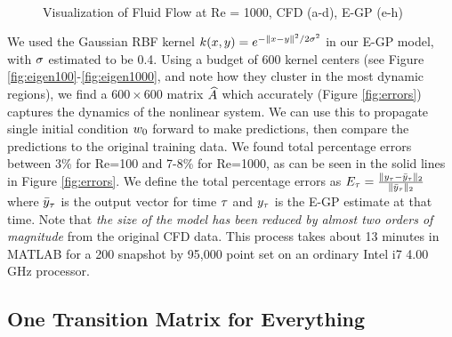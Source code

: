 \begin{figure*}[h] %
	\centering
	\\
	\caption{Visualization of Fluid Flow at Re = 1000, CFD (a-d), E-GP (e-h)}
	\label{fig:cfd_1000}
\end{figure*}

We used the Gaussian RBF kernel $k(x,y) = e^{-\|x-y\|^2/2\sigma^2}$ in our E-GP model, with $\sigma$ estimated to be 0.4. Using a budget of 600 kernel centers (see Figure \ref{fig:eigen100}-\ref{fig:eigen1000}, and note how they cluster in the most dynamic regions), we find a $600\times600$ matrix $\widehat{A}$ which accurately (Figure \ref{fig:errors}) captures the dynamics of the nonlinear system. We can use this to propagate single initial condition $w_{0}$ forward to make predictions, then compare the predictions to the original training data. We found total percentage errors between 3\% for Re=100 and 7-8\% for Re=1000, as can be seen in the solid lines in Figure \ref{fig:errors}. We define the total percentage errors as
$E_\tau = \frac{\|y_\tau-\bar y_\tau\|_2}{\|\bar y_\tau\|_2}$
where $\bar y_\tau$ is the output vector for time $\tau$ and $y_\tau$ is the E-GP estimate at that time. Note that \emph{the size of the model has been reduced by almost two orders of magnitude} from the original CFD data. This process takes about 13 minutes in MATLAB for a 200 snapshot by 95,000 point set on an ordinary Intel i7 4.00 GHz processor.

\subsection{One Transition Matrix for Everything}\label{sec:lotr}

